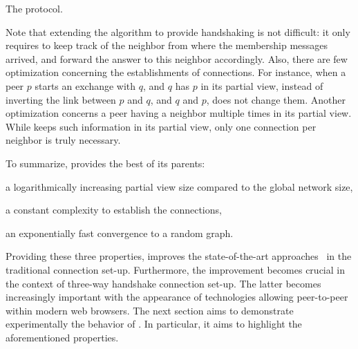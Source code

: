 \begin{algorithm}
  
  \caption{\label{algo:scamplon}The \SCAMPLON{} protocol.}
\end{algorithm}

Note that extending the algorithm to provide handshaking is not difficult: it
only requires to keep track of the neighbor from where the membership messages
arrived, and forward the answer to this neighbor accordingly. Also, there are
few optimization concerning the establishments of connections. For instance,
when a peer $p$ starts an exchange with $q$, and $q$ has $p$ in its partial
view, instead of inverting the link between $p$ and $q$, and $q$ and $p$,
\SCAMPLON{} does not change them. Another optimization concerns a peer having a
neighbor multiple times in its partial view. While \SCAMPLON{} keeps such
information in its partial view, only one connection per neighbor is truly
necessary.

To summarize, \SCAMPLON{} provides the best of its parents:
\begin{inparaenum}[(i)]
\item a logarithmically increasing partial view size compared to the global
  network size,
\item a constant complexity to establish the connections,
\item an exponentially fast convergence to a random graph.
\end{inparaenum}
Providing these three properties, \SCAMPLON{} improves the state-of-the-art
approaches~\cite{ganesh2001scamp,voulgaris2005cyclon} in the traditional
connection set-up. Furthermore, the improvement becomes crucial in the context
of three-way handshake connection set-up.  The latter becomes increasingly
important with the appearance of technologies allowing peer-to-peer within
modern web browsers.  The next section aims to demonstrate experimentally the
behavior of \SCAMPLON{}. In particular, it aims to highlight the
aforementioned properties.


